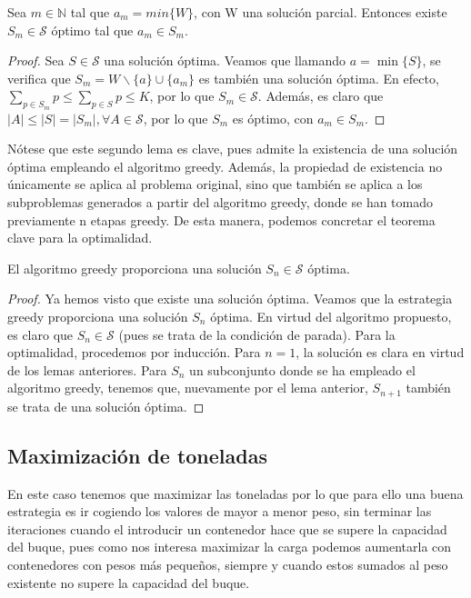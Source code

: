 \begin{lemma}
    Sea $m \in \mathbb N$ tal que $a_{m} = min\{W\}$, con W una solución parcial. Entonces existe $S_m \in \mathcal S$ óptimo tal que
    $a_m \in S_m$. 
\end{lemma}

\begin{proof}
    Sea $S \in \mathcal S$ una solución óptima. Veamos que llamando $a = \min\{S\}$, se verifica que
    $S_m = W \backslash\{a\}\cup{\{a_m\}}$ es también una solución óptima. En efecto, $\sum_{p \in S_m} p \leq 
    \sum_{p \in S} p \leq K$, por lo que $S_m \in \mathcal S$. Además, es claro que
    $ |A| \leq |S| = |S_m|, \forall A \in \mathcal S$, por lo que $S_m$ es óptimo, con $a_m \in S_m$. 
\end{proof}

Nótese que este segundo lema es clave, pues admite la existencia de una solución óptima empleando
el algoritmo greedy. Además, la propiedad de existencia no únicamente
se aplica al problema original, sino que también se aplica a los subproblemas generados a
partir del algoritmo greedy, donde se han tomado previamente n etapas greedy. 
De esta manera, podemos concretar el teorema clave para la optimalidad.

\begin{theorem}
    El algoritmo greedy proporciona una solución $S_{n} \in \mathcal{S}$ óptima. 
\end{theorem}

\begin{proof}
    Ya hemos visto que existe una solución óptima. Veamos que la estrategia greedy proporciona
    una solución $S_n$ óptima. En virtud del algoritmo propuesto, es claro que 
    $S_n \in \mathcal S$ (pues se trata de la condición de parada). Para la optimalidad,
    procedemos por inducción. Para $n=1$, la solución es clara en virtud de los lemas
    anteriores. Para $S_n$ un subconjunto donde se ha empleado el algoritmo greedy, tenemos que,
    nuevamente por el lema anterior, $S_{n+1}$ también se trata de una solución óptima. 
\end{proof}

\newpage

\subsection{Maximización de toneladas}
En este caso tenemos que maximizar las toneladas por lo que para ello una buena estrategia es ir cogiendo los valores 
de mayor a menor peso, sin terminar las iteraciones cuando el introducir un contenedor hace que se supere la capacidad del
buque, pues como nos interesa maximizar la carga podemos aumentarla con contenedores con pesos más pequeños, siempre y cuando 
estos sumados al peso existente no supere la capacidad del buque.

